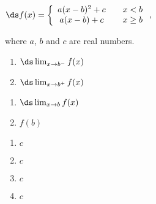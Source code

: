 {$\ds f(x) = \left\{\begin{array}{ccc}
	a(x-b)^2+c & & x<b \\
	a(x-b)+c & & x\geq b
	\end{array}
	\right.,
$

where $a$, $b$ and $c$ are real numbers.

\noindent\begin{minipage}[t]{.5\linewidth}
\begin{enumerate}
\item		$\ds \lim_{x\to b^-} f(x)$
\item		$\ds \lim_{x\to b^+} f(x)$
\end{enumerate}
\end{minipage}
\noindent\begin{minipage}[t]{.5\linewidth}
\begin{enumerate}\addtocounter{enumii}{2}
\item		$\ds \lim_{x\to b} f(x)$
\item		$f(b)$
\end{enumerate}
\end{minipage}
}
{\begin{enumerate}
\item		$c$
\item		$c$
\item		$c$
\item	  $c$
\end{enumerate}
}


